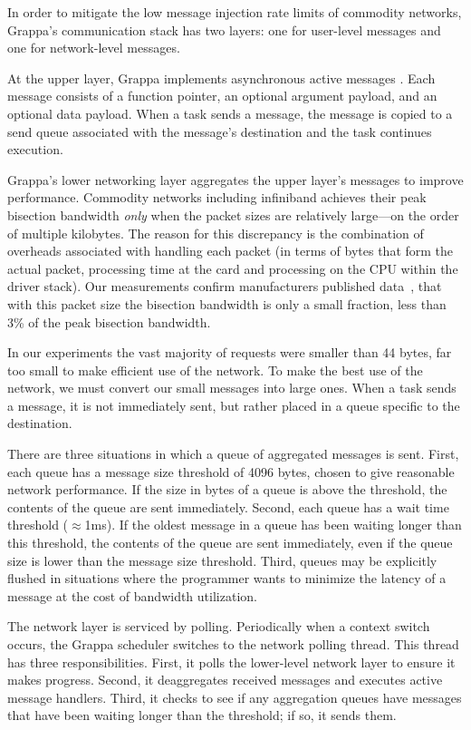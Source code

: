 In order to mitigate the low message injection rate limits of commodity
networks, Grappa's communication stack has two layers: one for
user-level messages and one for network-level messages. 

At the upper layer, Grappa implements asynchronous active messages
\cite{vonEicken92}. Each message consists of a function pointer, an
optional argument payload, and an optional data payload. When a task
sends a message, the message is copied to a send queue associated with
the message's destination and the task continues execution.

Grappa's lower networking layer aggregates the upper layer's messages
to improve performance. Commodity networks including infiniband
achieves their peak bisection bandwidth \emph{only} when the packet
sizes are relatively large---on the order of multiple kilobytes. The
reason for this discrepancy is the combination of overheads associated
with handling each packet (in terms of bytes that form the actual
packet, processing time at the card and processing on the
CPU within the driver stack). Our measurements confirm manufacturers
published data~\cite{infinibandbandwidth}, that with this packet size
the bisection bandwidth is only a small fraction, less than
3\% of the peak bisection bandwidth.

In our experiments the vast majority of requests were smaller than
44 bytes, far too small to make
efficient use of the network. To make the best use of the network, we
must convert our small messages into large ones.
When a task sends a message,
it is not immediately sent, but rather placed in a queue specific to the
destination.

There are three situations in which a queue of aggregated messages is
sent. First, each queue has a message size threshold of 4096 bytes, chosen to give reasonable network performance. If the size in
bytes of a queue is above the threshold, the contents of the queue are
sent immediately. Second, each queue has a wait time threshold
($\approx${1ms}). If the oldest message in a queue has been waiting
longer than this threshold, the contents of the queue are sent
immediately, even if the queue size is lower than the message size
threshold.  Third, queues may be explicitly flushed in situations where
the programmer wants to minimize the latency of a message at the cost of
bandwidth utilization.

The network layer is serviced by polling. Periodically when a context
switch occurs, the Grappa scheduler switches to the network polling
thread. This thread has three responsibilities. First, it polls the
lower-level network layer to ensure it makes progress. Second, it
deaggregates received messages and executes active message
handlers. Third, it checks to see if any aggregation queues have
messages that have been waiting longer than the threshold; if so, it
sends them.

